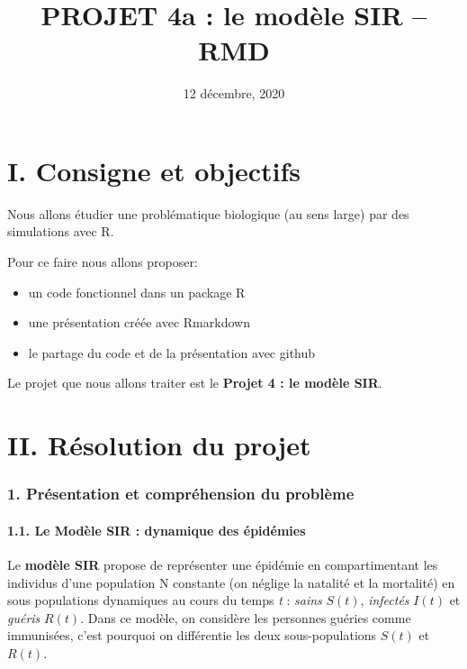 \documentclass[
]{article}
\title{PROJET 4a : le modèle SIR -- RMD}
\author{}
\date{\vspace{-2.5em}12 décembre, 2020}
\begin{document}
\maketitle

\hypertarget{i.-consigne-et-objectifs}{%
\section{I. Consigne et objectifs}\label{i.-consigne-et-objectifs}}

Nous allons étudier une problématique biologique (au sens large) par des
simulations avec R.

Pour ce faire nous allons proposer:

\begin{itemize}
\item
  un code fonctionnel dans un package R
\item
  une présentation créée avec Rmarkdown
\item
  le partage du code et de la présentation avec github
\end{itemize}

Le projet que nous allons traiter est le \textbf{Projet 4 : le modèle
SIR}.

\hypertarget{ii.-ruxe9solution-du-projet}{%
\section{II. Résolution du projet}\label{ii.-ruxe9solution-du-projet}}

\hypertarget{pruxe9sentation-et-compruxe9hension-du-probluxe8me}{%
\subsubsection{1. Présentation et compréhension du
problème}\label{pruxe9sentation-et-compruxe9hension-du-probluxe8me}}

\hypertarget{le-moduxe8le-sir-dynamique-des-uxe9piduxe9mies}{%
\paragraph{1.1. Le Modèle SIR : dynamique des
épidémies}\label{le-moduxe8le-sir-dynamique-des-uxe9piduxe9mies}}

Le \textbf{modèle SIR} propose de représenter une épidémie en
compartimentant les individus d'une population N constante (on néglige
la natalité et la mortalité) en sous populations dynamiques au cours du
temps \emph{t} : \emph{sains} \textbf{\(S(t)\)}, \emph{infectés}
\textbf{\(I(t)\)} et \emph{guéris} \textbf{\(R(t)\)}. Dans ce modèle, on
considère les personnes guéries comme immunisées, c'est pourquoi on
différentie les deux sous-populations \(S(t)\) et \(R(t)\).
\end{document}

